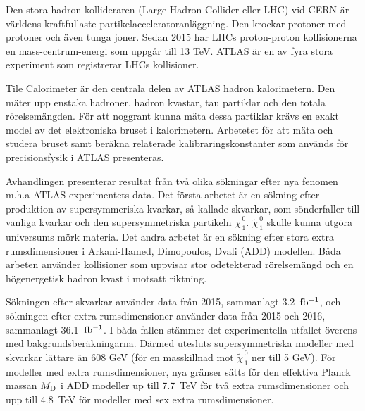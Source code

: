 Den stora hadron kollideraren (Large Hadron Collider eller LHC) vid CERN är
världens kraftfullaste partikelacceleratoranläggning. Den krockar protoner med
protoner och även tunga joner. Sedan 2015 har LHCs proton-proton kollisionerna
en mass-centrum-energi som uppgår till 13 TeV. ATLAS är en av fyra stora
experiment som registrerar LHCs kollisioner.

Tile Calorimeter är den centrala delen av ATLAS hadron kalorimetern. Den mäter
upp enstaka hadroner, hadron kvastar, tau partiklar och den totala
rörelsemängden. För att noggrant kunna mäta dessa partiklar krävs en exakt model
av det elektroniska bruset i kalorimetern. Arbetetet för att mäta och studera
bruset samt beräkna relaterade kalibraringskonstanter som används för
precisionsfysik i ATLAS presenteras.

Avhandlingen presenterar resultat från två olika sökningar efter nya fenomen
m.h.a ATLAS experimentets data. Det första arbetet är en sökning efter
produktion av supersymmeriska kvarkar, så kallade skvarkar, som sönderfaller
till vanliga kvarkar och den supersymmetriska partikeln
$\tilde{\chi}_{\, 1}^{\, 0}$. $\tilde{\chi}_{\, 1}^{\, 0}$ skulle kunna utgöra
universums mörk materia. Det andra arbetet är en sökning efter stora extra
rumsdimensioner i Arkani-Hamed, Dimopoulos, Dvali (ADD) modellen. Båda arbeten
använder kollisioner som uppvisar stor odetekterad rörelsemängd och en
högenergetisk hadron kvast i motsatt riktning.

Sökningen efter skvarkar använder data från 2015, sammanlagt 3.2~$\mbox{fb$^{-1}$}$, och
sökningen efter extra rumsdimensioner använder data från 2015 och 2016,
sammanlagt 36.1~$\mbox{fb$^{-1}$}$. I båda fallen stämmer det experimentella utfallet
överens med bakgrundsberäkningarna. Därmed utesluts supersymmetriska modeller
med skvarkar lättare än 608 GeV (för en masskillnad mot
$\tilde{\chi}_{\, 1}^{\, 0}$ ner till 5 GeV). För modeller med extra
rumsdimensioner, nya gränser sätts för den effektiva Planck massan $M_\mathrm{D}$ i ADD
modeller up till 7.7~TeV för två extra rumsdimensioner och upp till 4.8~TeV för
modeller med sex extra rumsdimensioner.
